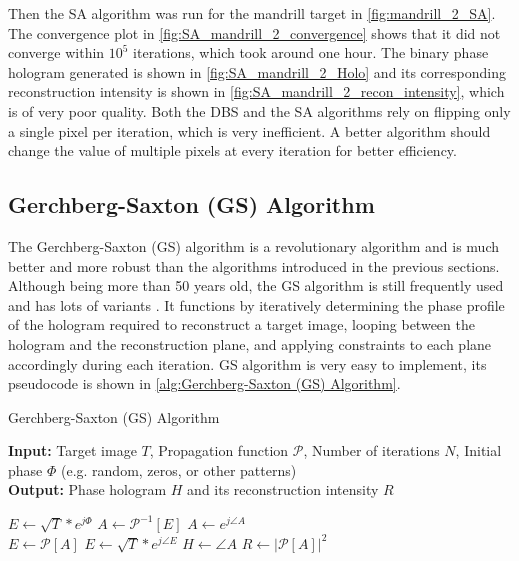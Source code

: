 Then the SA algorithm was run for the mandrill target in \cref{fig:mandrill_2_SA}. The convergence plot in \cref{fig:SA_mandrill_2_convergence} shows that it did not converge within $10^5$ iterations, which took around one hour. The binary phase hologram generated is shown in \cref{fig:SA_mandrill_2_Holo} and its corresponding reconstruction intensity is shown in \cref{fig:SA_mandrill_2_recon_intensity}, which is of very poor quality. Both the DBS and the SA algorithms rely on flipping only a single pixel per iteration, which is very inefficient. A better algorithm should change the value of multiple pixels at every iteration for better efficiency.


\subsection{Gerchberg-Saxton (GS) Algorithm}\label{sec:Gerchberg-Saxton (GS) Algorithm}
The Gerchberg-Saxton (GS) algorithm \cite{Gerchberg1972} is a revolutionary algorithm and is much better and more robust than the algorithms introduced in the previous sections. Although being more than 50 years old, the GS algorithm is still frequently used and has lots of variants \cite{Yang1994, WANG2017, Zhou2019}. It functions by iteratively determining the phase profile of the hologram required to reconstruct a target image, looping between the hologram and the reconstruction plane, and applying constraints to each plane accordingly during each iteration. GS algorithm is very easy to implement, its pseudocode is shown in \cref{alg:Gerchberg-Saxton (GS) Algorithm}.

\begin{algorithm}[H]
  \caption{Gerchberg-Saxton (GS) Algorithm}\label{alg:Gerchberg-Saxton (GS) Algorithm}
  \textbf{Input:} Target image $T$, Propagation function $\mathcal{P}$, Number of iterations $N$, Initial phase $\varPhi$ (e.g. random, zeros, or other patterns) \\
  \textbf{Output:} Phase hologram $H$ and its reconstruction intensity $R$
  \begin{algorithmic}
    \State $E \gets \sqrt{T} * e^{j\varPhi}$
    \State $A \gets \mathcal{P}^{-1}[E]$
    \State $A \gets e^{j\angle A}$\\
    \State $E \gets \mathcal{P}[A]$
    \State $E \gets \sqrt{T} * e^{j\angle E}$
    \EndFor
    \State $H \gets \angle A$
    \State $R \gets \vert \mathcal{P}[A] \vert ^2$
  \end{algorithmic}
\end{algorithm}

